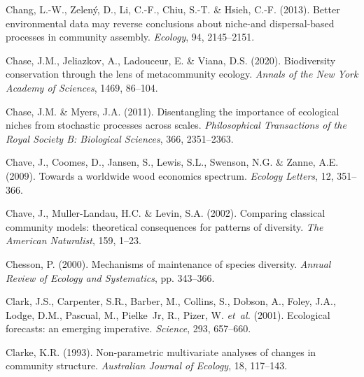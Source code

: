 \begin{thebibliography}{70}
	Chang, L.-W., Zelený, D., Li, C.-F., Chiu, S.-T. \& Hsieh, C.-F. (2013).
	\newblock Better environmental data may reverse conclusions about niche-and
	dispersal-based processes in community assembly.
	\newblock \emph{Ecology}, 94, 2145--2151.
	
	Chase, J.M., Jeliazkov, A., Ladouceur, E. \& Viana, D.S. (2020).
	\newblock Biodiversity conservation through the lens of metacommunity ecology.
	\newblock \emph{Annals of the New York Academy of Sciences}, 1469, 86--104.
	
	Chase, J.M. \& Myers, J.A. (2011).
	\newblock Disentangling the importance of ecological niches from stochastic
	processes across scales.
	\newblock \emph{Philosophical Transactions of the Royal Society B: Biological
		Sciences}, 366, 2351--2363.
	
	Chave, J., Coomes, D., Jansen, S., Lewis, S.L., Swenson, N.G. \& Zanne, A.E.
	(2009).
	\newblock Towards a worldwide wood economics spectrum.
	\newblock \emph{Ecology Letters}, 12, 351--366.
	
	Chave, J., Muller-Landau, H.C. \& Levin, S.A. (2002).
	\newblock Comparing classical community models: theoretical consequences for
	patterns of diversity.
	\newblock \emph{The American Naturalist}, 159, 1--23.
	
	Chesson, P. (2000).
	\newblock Mechanisms of maintenance of species diversity.
	\newblock \emph{Annual Review of Ecology and Systematics}, pp. 343--366.
	
	Clark, J.S., Carpenter, S.R., Barber, M., Collins, S., Dobson, A., Foley, J.A.,
	Lodge, D.M., Pascual, M., Pielke~Jr, R., Pizer, W. \emph{et~al.} (2001).
	\newblock Ecological forecasts: an emerging imperative.
	\newblock \emph{Science}, 293, 657--660.
	
	Clarke, K.R. (1993).
	\newblock Non-parametric multivariate analyses of changes in community
	structure.
	\newblock \emph{Australian Journal of Ecology}, 18, 117--143.
	

\end{thebibliography}
